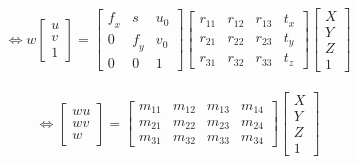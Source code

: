 \documentclass[11pt]{article}
\begin{document}
\begin{align*} 
    \Leftrightarrow \mathit{w}
    \begin{bmatrix}
        \mathit{u} \\
        \mathit{v} \\
        1
    \end{bmatrix}
    = 
    \begin{bmatrix}
        \mathit{f}_\mathit{x} & \mathit{s} & \mathit{u}_0\\
        0  & \mathit{f}_\mathit{y} & \mathit{v}_0\\
        0 & 0 & 1
    \end{bmatrix}
    \begin{bmatrix}
        \mathit{r}_{11} & \mathit{r}_{12} & \mathit{r}_{13} & \mathit{t}_\mathit{x} \\
        \mathit{r}_{21} & \mathit{r}_{22} & \mathit{r}_{23} & \mathit{t}_\mathit{y} \\
        \mathit{r}_{31} & \mathit{r}_{32} & \mathit{r}_{33} & \mathit{t}_\mathit{z}
    \end{bmatrix}
    \begin{bmatrix}
        \mathit{X}\\
        \mathit{Y}\\
        \mathit{Z}\\
        1
    \end{bmatrix}
\end{align*}

\begin{align*} 
    \Leftrightarrow
    \begin{bmatrix}
        \mathit{w}\mathit{u} \\
        \mathit{w}\mathit{v} \\
        \mathit{w}
    \end{bmatrix}
    = 
    \begin{bmatrix}
        \mathit{m}_{11} & \mathit{m}_{12} & \mathit{m}_{13} & \mathit{m}_\mathit{14} \\
        \mathit{m}_{21} & \mathit{m}_{22} & \mathit{m}_{23} & \mathit{m}_\mathit{24} \\
        \mathit{m}_{31} & \mathit{m}_{32} & \mathit{m}_{33} & \mathit{m}_\mathit{34}
    \end{bmatrix}
    \begin{bmatrix}
        \mathit{X}\\
        \mathit{Y}\\
        \mathit{Z}\\
        1
    \end{bmatrix}
\end{align*}
\end{document}
